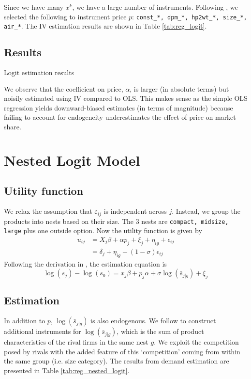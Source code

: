\documentclass[12pt]{article}[margin=1in]
\begin{document}
Since we have many $x^k$, we have a large number of instruments. Following
\citet{berrylevinsohnpakes1995}, we selected the following to instrument price
$p$: \verb|const_*, dpm_*, hp2wt_*, size_*, air_*|. The IV estimation results
are shown in Table \ref{tab:reg_logit}.

\subsection{Results}

\begin{table}[h!]
    \fontsize{8pt}{10pt}\selectfont
    \centering
    
    \caption{Logit estimation results}
    \label{tab:reg_logit}
\end{table}

We observe that the coefficient on price, $\alpha$, is larger (in absolute
terms) but noisily estimated using IV compared to OLS. This makes sense as the
simple OLS regression yields downward-biased estimates (in terms of magnitude)
because failing to account for endogeneity underestimates the effect of price
on market share.

\section{Nested Logit Model}
\subsection{Utility function}
We relax the assumption that $\varepsilon_{ij}$ is independent across $j$.
Instead, we group the products into nests based on their size. The 3 nests are
\verb|compact, midsize, large| plus one outside option. Now the utility
function is given by
\begin{equation}
    \begin{split}
        u_{ij} & =X_{j}\beta + \alpha p_{j} + \xi_{j} + \eta_{ig} + \epsilon_{ij} \\
               & =\delta_j + \eta_{ig} + (1 - \sigma)\epsilon_{ij}
    \end{split}
\end{equation}
Following the derivation in \citet{berry1994estimating}, the estimation equation is
\begin{equation}
    \log(s_j) - \log(s_0) = x_j\beta + p_j\alpha + \sigma\log(\bar{s}_{j|g}) + \xi_j
\end{equation}

\subsection{Estimation}
In addition to $p$, $\log(\bar{s}_{j|g})$ is also endogenous. We follow
\citet{berry1994estimating} to construct additional instruments for
$\log(\bar{s}_{j|g})$, which is the sum of product characteristics of the rival
firms in the same nest $g$. We exploit the competition posed by rivals with the
added feature of this `competition' coming from within the same group (i.e.
size category). The results from demand estimation are presented in Table
\ref{tab:reg_nested_logit}.
\end{document}

